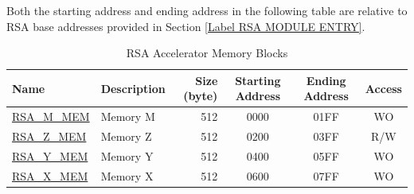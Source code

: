 Both the starting address and ending address in the following table are relative to RSA base addresses provided in Section \ref{Label RSA MODULE ENTRY}.


\begin{longtable}{ | p{3cm} | p{3cm} | r | c | c | c | }
\caption{RSA Accelerator Memory Blocks} \label{regdesc:RSAmemory}
\\ \hline
\rowcolor{lightgray}
Name & Description  &  Size (byte)  &  Starting Address  &  Ending Address  & Access   \\ \hline

\hyperref[regdesc:RSAmemory]{RSA\_M\_MEM} & Memory M  & 512  & \hexprefix{}0000 & \hexprefix{}01FF & WO \\ \hline
\hyperref[regdesc:RSAmemory]{RSA\_Z\_MEM} & Memory Z  & 512  & \hexprefix{}0200 & \hexprefix{}03FF & R/W \\ \hline
\hyperref[regdesc:RSAmemory]{RSA\_Y\_MEM} & Memory Y  & 512  & \hexprefix{}0400 & \hexprefix{}05FF & WO \\ \hline
\hyperref[regdesc:RSAmemory]{RSA\_X\_MEM} & Memory X  & 512  & \hexprefix{}0600 & \hexprefix{}07FF & WO \\ \hline

\end{longtable}


